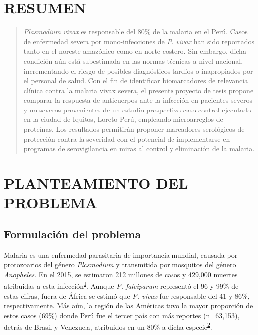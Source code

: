 \documentclass[]{article}
\begin{document}
\vfill
\restoregeometry
\clearpage

\newpage

\tableofcontents

\newpage


\section*{RESUMEN}\label{resumen}

\begin{quote}
\emph{Plasmodium vivax} es responsable del 80\% de la malaria en el
Perú. Casos de enfermedad severa por mono-infecciones de \emph{P. vivax}
han sido reportados tanto en el noreste amazónico como en norte costero.
Sin embargo, dicha condición aún está subestimada en las normas técnicas
a nivel nacional, incrementando el riesgo de posibles diagnósticos
tardíos o inapropiados por el personal de salud. Con el fin de
identificar biomarcadores de relevancia clínica contra la malaria vivax
severa, el presente proyecto de tesis propone comparar la respuesta de
anticuerpos ante la infección en pacientes severos y no-severos
provenientes de un estudio prospectivo caso-control ejecutado en la
ciudad de Iquitos, Loreto-Perú, empleando microarreglos de proteínas.
Los resultados permitirán proponer marcadores serológicos de protección
contra la severidad con el potencial de implementarse en programas de
serovigilancia en miras al control y eliminación de la malaria.
\end{quote}

\section{PLANTEAMIENTO DEL PROBLEMA}\label{planteamiento-del-problema}

\subsection{Formulación del problema}\label{intro}

Malaria es una enfermedad parasitaria de importancia mundial, causada
por protozoarios del género \emph{Plasmodium} y transmitida por
mosquitos del género \emph{Anopheles}. En el 2015, se estimaron 212
millones de casos y 429,000 muertes atribuidas a esta
infección\textsuperscript{\protect\hyperlink{ref-WHO2016world}{1}}.
Aunque \emph{P. falciparum} representó el 96 y 99\% de estas cifras,
fuera de África se estimó que \emph{P. vivax} fue responsable del 41 y
86\%, respectivamente. Más aún, la región de las Américas tuvo la mayor
proporción de estos casos (69\%) donde Perú fue el tercer país con más
reportes (n=63,153), detrás de Brasil y Venezuela, atribuidos en un 80\%
a dicha
especie\textsuperscript{\protect\hyperlink{ref-rosas2016peru}{2}}.
\end{document}
